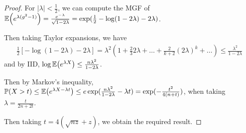 \begin{proof}
  For $| \lambda | < \frac{1}{2}$, we can compute the MGF of
  $\E{e^{\lambda(g^{2} - 1)}} = \frac{e^{-\lambda}}{\sqrt{1 -
      2\lambda}} = \exp(\frac{1}{2} -\log(1 - 2 \lambda) - 2
  \lambda)$.

  Then taking Taylor expansions, we have
  \begin{align}
    \label{eq:66}
    \frac{1}{2} [- \log (1 - 2 \lambda) - 2 \lambda] = \lambda^{2} (1
    + \frac{2}{3} 2 \lambda + \dots + \frac{2}{k+2}(2\lambda)^{k} +
    \dots) \leq \frac{\lambda^{2}}{1 - 2 \lambda}
  \end{align} and by IID, $\log \E{e^{\lambda X}} \leq \frac{n
    \lambda^{2}}{1 - 2 \lambda} $.

  Then by Markov's inequality, $\Prob{X > t} \leq \E{e^{\lambda X -
      \lambda t}} \leq e\exp(\frac{n\lambda^{2}}{1-2\lambda} - \lambda
  t) = \exp(-\frac{t^{2}}{4(n+t)})$, when taking $\lambda =
  \frac{t}{2n + 2t}$.

  Then taking $t = 4(\sqrt{nz} + z)$, we obtain the required result.
\end{proof}





